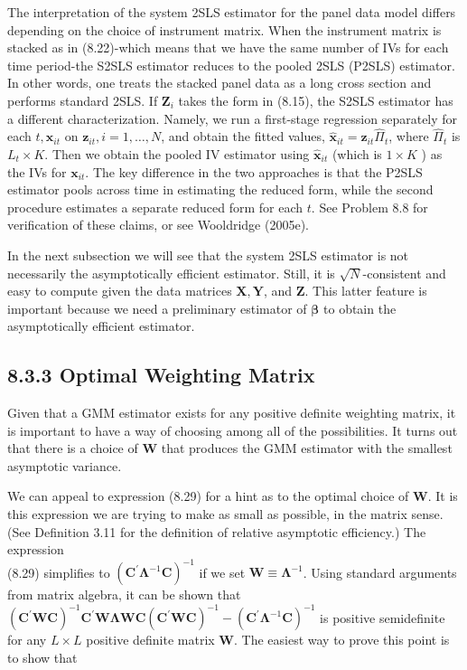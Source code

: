 \documentclass[10pt]{article}
\begin{document}
The interpretation of the system 2SLS estimator for the panel data model differs depending on the choice of instrument matrix. When the instrument matrix is stacked as in (8.22)-which means that we have the same number of IVs for each time period-the S2SLS estimator reduces to the pooled 2SLS (P2SLS) estimator. In other words, one treats the stacked panel data as a long cross section and performs standard 2SLS. If $\mathbf{Z}_{i}$ takes the form in (8.15), the S2SLS estimator has a different characterization. Namely, we run a first-stage regression separately for each $t, \mathbf{x}_{i t}$ on $\mathbf{z}_{i t}, i=1, \ldots, N$, and obtain the fitted values, $\hat{\mathbf{x}}_{i t}=\mathbf{z}_{i t} \hat{\Pi}_{t}$, where $\hat{\Pi}_{t}$ is $L_{t} \times K$. Then we obtain the pooled IV estimator using $\hat{\mathbf{x}}_{i t}$ (which is $1 \times K$ ) as the IVs for $\mathbf{x}_{i t}$. The key difference in the two approaches is that the P2SLS estimator pools across time in estimating the reduced form, while the second procedure estimates a separate reduced form for each $t$. See Problem 8.8 for verification of these claims, or see Wooldridge (2005e).

In the next subsection we will see that the system 2SLS estimator is not necessarily the asymptotically efficient estimator. Still, it is $\sqrt{N}$-consistent and easy to compute given the data matrices $\mathbf{X}, \mathbf{Y}$, and $\mathbf{Z}$. This latter feature is important because we need a preliminary estimator of $\boldsymbol{\beta}$ to obtain the asymptotically efficient estimator.

\subsection*{8.3.3 Optimal Weighting Matrix}
Given that a GMM estimator exists for any positive definite weighting matrix, it is important to have a way of choosing among all of the possibilities. It turns out that there is a choice of $\mathbf{W}$ that produces the GMM estimator with the smallest asymptotic variance.

We can appeal to expression (8.29) for a hint as to the optimal choice of $\mathbf{W}$. It is this expression we are trying to make as small as possible, in the matrix sense. (See Definition 3.11 for the definition of relative asymptotic efficiency.) The expression\\
(8.29) simplifies to $\left(\mathbf{C}^{\prime} \boldsymbol{\Lambda}^{-1} \mathbf{C}\right)^{-1}$ if we set $\mathbf{W} \equiv \boldsymbol{\Lambda}^{-1}$. Using standard arguments from matrix algebra, it can be shown that $\left(\mathbf{C}^{\prime} \mathbf{W C}\right)^{-1} \mathbf{C}^{\prime} \mathbf{W} \boldsymbol{\Lambda} \mathbf{W C}\left(\mathbf{C}^{\prime} \mathbf{W C}\right)^{-1}-\left(\mathbf{C}^{\prime} \boldsymbol{\Lambda}^{-1} \mathbf{C}\right)^{-1}$ is positive semidefinite for any $L \times L$ positive definite matrix $\mathbf{W}$. The easiest way to prove this point is to show that
\end{document}
